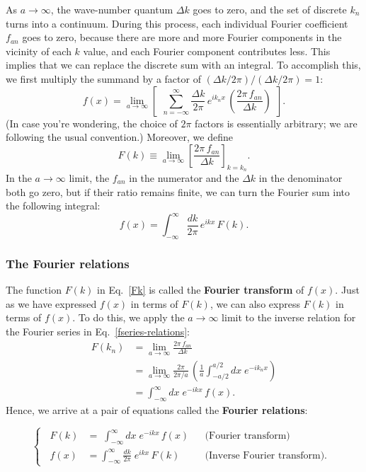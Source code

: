 \documentclass[10pt,a4paper]{article}
\begin{document}
As $a \rightarrow \infty$, the wave-number quantum $\Delta k$ goes to
zero, and the set of discrete $k_n$ turns into a continuum. During
this process, each individual Fourier coefficient $f_{an}$ goes to
zero, because there are more and more Fourier components in the
vicinity of each $k$ value, and each Fourier component contributes
less. This implies that we can replace the discrete sum with an
integral. To accomplish this, we first multiply the summand by a
factor of $(\Delta k/2\pi) / (\Delta k/2\pi) = 1$:
\begin{equation}
f(x) = \lim_{a\rightarrow \infty} \left[\;\,\sum_{n=-\infty}^\infty \frac{\Delta k}{2\pi} \, e^{i k_n x}\, \left(\frac{2\pi \,f_{an}}{\Delta k} \right)\;\,\right].
\end{equation}
(In case you're wondering, the choice of $2\pi$ factors is essentially
arbitrary; we are following the usual convention.) Moreover, we define
\begin{equation}
F(k) \equiv \lim_{a \rightarrow \infty} \left[\frac{2\pi\, f_{an}}{\Delta k}\right]_{k = k_n}.
\end{equation}
In the $a \rightarrow \infty$ limit, the $f_{an}$ in the numerator
and the $\Delta k$ in the denominator both go zero, but if their ratio
remains finite, we can turn the Fourier sum into the following integral:
\begin{equation}
f(x) = \int_{-\infty}^{\infty} \frac{dk}{2\pi} \, e^{i k x}\, F(k).
\label{Fk}
\end{equation}

\subsubsection{The Fourier relations}
\label{the-fourier-relations}

The function $F(k)$ in Eq.~\eqref{Fk} is called the \textbf{Fourier
  transform} of $f(x)$. Just as we have expressed $f(x)$ in terms of
$F(k)$, we can also express $F(k)$ in terms of $f(x)$. To do this, we
apply the $a \rightarrow \infty$ limit to the inverse relation for the
Fourier series in Eq.~\eqref{fseries-relations}:
\begin{align}
  F(k_n) &= \lim_{a\rightarrow \infty} \frac{2 \pi\, f_{an}}{\Delta k} \\
 &= \lim_{a\rightarrow \infty} \frac{2 \pi}{2\pi/a}\, \left(\frac{1}{a} \int_{-a/2}^{a/2} dx\; e^{-i k_n x}\right) \\
  &= \int_{-\infty}^\infty dx\; e^{-i kx}\, f(x).
\end{align}
Hence, we arrive at a pair of equations called the \textbf{Fourier
  relations}:
\begin{framed}
\begin{equation}
  \left\{\;\;\begin{aligned}F(k) &= \;\int_{-\infty}^\infty dx\; e^{-ikx}\, f(x) &&\text{(Fourier transform)}\\ f(x) &= \int_{-\infty}^\infty \frac{dk}{2\pi}\; e^{ikx}\, F(k)&&\text{(Inverse Fourier transform).}\end{aligned}\;\;\right.
  \label{fourier-relations}
\end{equation}
\end{framed}
\end{document}

